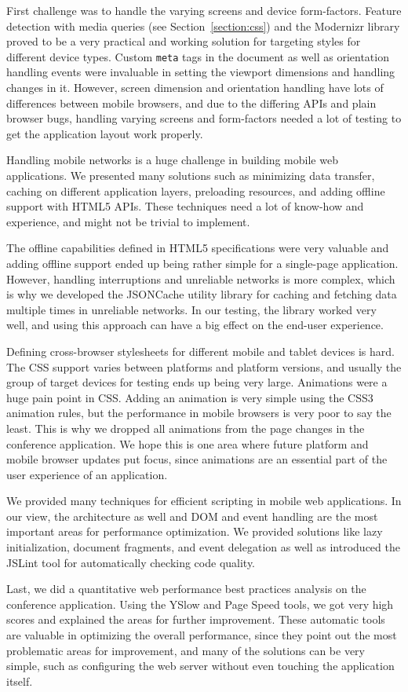 First challenge was to handle the varying screens and device
form-factors. Feature detection with media queries (see
Section~\ref{section:css}) and the Modernizr library proved to be a
very practical and working solution for targeting styles for different
device types. Custom \texttt{meta} tags in the document as well as
orientation handling events were invaluable in setting the viewport
dimensions and handling changes in it. However, screen dimension and
orientation handling have lots of differences between mobile browsers,
and due to the differing APIs and plain browser bugs, handling varying
screens and form-factors needed a lot of testing to get the
application layout work properly.

Handling mobile networks is a huge challenge in building mobile web
applications. We presented many solutions such as minimizing data
transfer, caching on different application layers, preloading
resources, and adding offline support with HTML5 APIs. These
techniques need a lot of know-how and experience, and might not be
trivial to implement.

The offline capabilities defined in HTML5 specifications were very
valuable and adding offline support ended up being rather simple for a
single-page application. However, handling interruptions and
unreliable networks is more complex, which is why we developed the
JSONCache utility library for caching and fetching data multiple times
in unreliable networks. In our testing, the library worked very well,
and using this approach can have a big effect on the end-user
experience.

Defining cross-browser stylesheets for different mobile and tablet
devices is hard. The CSS support varies between platforms and platform
versions, and usually the group of target devices for testing ends up
being very large. Animations were a huge pain point in CSS. Adding an
animation is very simple using the CSS3 animation rules, but the
performance in mobile browsers is very poor to say the least. This is
why we dropped all animations from the page changes in the conference
application. We hope this is one area where future platform and mobile
browser updates put focus, since animations are an essential part of
the user experience of an application.

We provided many techniques for efficient scripting in mobile web
applications. In our view, the architecture as well and DOM and event
handling are the most important areas for performance optimization. We
provided solutions like lazy initialization, document fragments, and
event delegation as well as introduced the JSLint tool for
automatically checking code quality.

Last, we did a quantitative web performance best practices analysis on
the conference application. Using the YSlow and Page Speed tools, we
got very high scores and explained the areas for further
improvement. These automatic tools are valuable in optimizing the
overall performance, since they point out the most problematic areas
for improvement, and many of the solutions can be very simple, such as
configuring the web server without even touching the application
itself.
